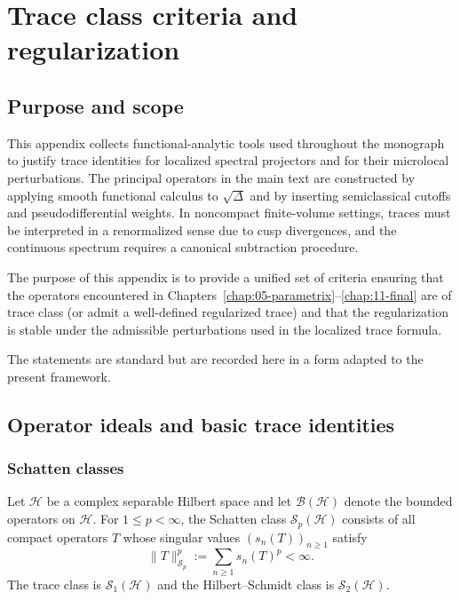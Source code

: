 
\appendix
\chapter{Trace class criteria and regularization}
\label{app:L.traceclass}

\section{Purpose and scope}
\label{sec:L.purpose}

This appendix collects functional-analytic tools used throughout the monograph to justify trace identities for
localized spectral projectors and for their microlocal perturbations.  The principal operators in the main text are
constructed by applying smooth functional calculus to $\sqrt{\Delta}$ and by inserting semiclassical cutoffs and
pseudodifferential weights.  In noncompact finite-volume settings, traces must be interpreted in a renormalized
sense due to cusp divergences, and the continuous spectrum requires a canonical subtraction procedure.

The purpose of this appendix is to provide a unified set of criteria ensuring that the operators encountered in
Chapters~\ref{chap:05-parametrix}--\ref{chap:11-final} are of trace class (or admit a well-defined regularized trace)
and that the regularization is stable under the admissible perturbations used in the localized trace formula.

The statements are standard but are recorded here in a form adapted to the present framework.

\section{Operator ideals and basic trace identities}
\label{sec:L.ideals}

\subsection{Schatten classes}
\label{subsec:L.schatten}

Let $\mathcal{H}$ be a complex separable Hilbert space and let $\mathcal{B}(\mathcal{H})$ denote the bounded
operators on $\mathcal{H}$.  For $1\le p<\infty$, the Schatten class $\mathcal{S}_p(\mathcal{H})$ consists of all
compact operators $T$ whose singular values $(s_n(T))_{n\ge 1}$ satisfy
\[
\|T\|_{\mathcal{S}_p}^p := \sum_{n\ge 1} s_n(T)^p < \infty.
\]
The trace class is $\mathcal{S}_1(\mathcal{H})$ and the Hilbert--Schmidt class is $\mathcal{S}_2(\mathcal{H})$.

